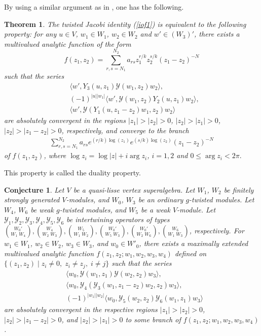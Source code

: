 \documentclass[9pt]{amsart}
\newtheorem{theorem}{Theorem}[section]
\newtheorem{conjecture}{Conjecture}[section]
\newcommand{\Y}{\mathcal{Y}}
\begin{document}
By using a similar argument as in \cite[Theorem 2.4]{huang2010generalized}, one has the following. 

\begin{theorem}
The twisted Jacobi identity (\ref{iof1}) is equivalent to the following property: for any $u\in V$, $w_1\in W_1$, $w_2\in W_2$ and $w'\in (W_3)'$, there exists a multivalued analytic function of the form
\[
    f(z_1,z_2)=\sum_{r,s=N_1}^{N_2}a_{rs}z_{1}^{r/k}z_2^{s/k}(z_1-z_2)^{-N}
\]
such that the series
\begin{align*}
    & \langle w', Y_3(u,z_1)\mathcal{Y}(w_1,z_2)w_2 \rangle,\\
    & (-1)^{|u||w_1|} \langle w', \mathcal{Y}(w_1,z_2)Y_2(u,z_{1})w_2\rangle,\\
    & \langle w',\mathcal{Y}(Y_1(u,z_1-z_2)w_1,z_2)w_2\rangle
\end{align*}
are absolutely convergent in the regions $|z_1|>|z_2|>0$, $|z_2|>|z_1|>0$, $|z_2|>|z_1-z_2|>0$, respectively, and converge to the branch
\begin{align*}
    \sum_{r,s=N_1}^{N_2}a_{rs}e^{(r/k)\log(z_1)}e^{(s/k)\log(z_2)}(z_1-z_2)^{-N}\end{align*}of $f(z_1,z_2)$, where $\log z_i=\log |z|+i\operatorname{arg}z_i$, $i=1,2$ and $0\leq   \operatorname{arg}z_i<2\pi.$
\end{theorem}
\noindent This property is called the duality property.

\begin{conjecture}\label{duality}
 Let $V$ be a quasi-lisse vertex superalgebra. Let $W_1$, $W_2$ be finitely strongly generated $V$-modules, and $ W_0$, $W_3$ be an ordinary $g$-twisted modules. Let $W_4$, $W_6$ be weak $g$-twisted modules, and $W_5$ be a weak $V$-module. Let $\Y_1,\Y_2,\Y_3,\Y_4,\Y_5,\Y_6$ be intertwining operators of types $\binom{W_0'}{W_1\;W_4},\binom{W_4}{W_2\;W_3},\binom{W_5}{W_1\;W_2},\binom{W_0'}{W_5\;W_3},\binom{W_0'}{W_2\;W_6},\binom{W_6}{W_1\;W_3}$, respectively.  For $w_1\in W_1$, $w_2\in W_2$, $w_3\in W_3$, and $w_0\in W'_0$, there exists a maximally extended multivalued analytic function $f(z_1,z_2;w_1,w_2,w_3,w_4)$ defined on $\{(z_1,z_2)\mid z_i\neq 0,\; z_i\neq z_j,\; i\neq j\}$ such that the series
 \begin{align*}
 &\langle w_0,\Y(w_1,z_1)\Y(w_2,z_2)w_3\rangle,\\
 &\langle w_0,\Y_4(\Y_3(w_1,z_1-z_2)w_2,z_2)w_3\rangle,\\
 &(-1)^{|w_1||w_2|}\langle w_0,\Y_5(w_2,z_2)\Y_6(w_1,z_1)w_3\rangle	
 \end{align*}
are absolutely convergent in the respective regions $|z_1|>|z_2|>0$, $|z_2|>|z_1-z_2|>0$, and $|z_2|>|z_1|>0$ to some branch of $f(z_1,z_2;w_1,w_2,w_3,w_4)$. 
\end{conjecture}
\end{document}
